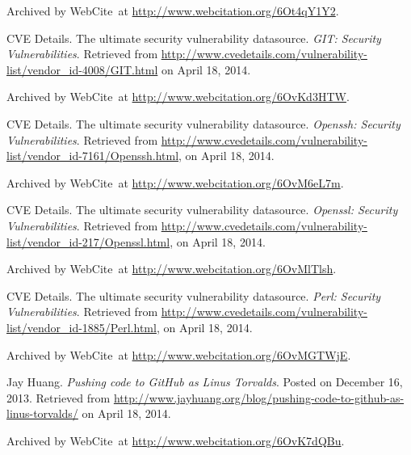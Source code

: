 \begin{thebibliography}{9}
Archived by WebCite\textsuperscript{\textregistered}\ at
\url{http://www.webcitation.org/6Ot4qY1Y2}.


CVE Details. The ultimate security vulnerability datasource. \emph{GIT:
Security Vulnerabilities}. Retrieved from
\url{http://www.cvedetails.com/vulnerability-list/vendor_id-4008/GIT.html} on
April 18, 2014.

Archived by WebCite\textsuperscript{\textregistered}\ at
\url{http://www.webcitation.org/6OvKd3HTW}.


CVE Details. The ultimate security vulnerability datasource. \emph{Openssh:
Security Vulnerabilities}. Retrieved from
\url{http://www.cvedetails.com/vulnerability-list/vendor_id-7161/Openssh.html},
on April 18, 2014.

Archived by WebCite\textsuperscript{\textregistered}\ at
\url{http://www.webcitation.org/6OvM6eL7m}.


CVE Details. The ultimate security vulnerability datasource. \emph{Openssl:
Security Vulnerabilities}. Retrieved from
\url{http://www.cvedetails.com/vulnerability-list/vendor_id-217/Openssl.html},
on April 18, 2014.

Archived by WebCite\textsuperscript{\textregistered}\ at
\url{http://www.webcitation.org/6OvMlTlsh}.


CVE Details. The ultimate security vulnerability datasource. \emph{Perl:
Security Vulnerabilities}. Retrieved from
\url{http://www.cvedetails.com/vulnerability-list/vendor_id-1885/Perl.html}, on
April 18, 2014.

Archived by WebCite\textsuperscript{\textregistered}\ at
\url{http://www.webcitation.org/6OvMGTWjE}.


Jay Huang. \emph{Pushing code to GitHub as Linus Torvalds}. Posted on December
16, 2013. Retrieved from
\url{http://www.jayhuang.org/blog/pushing-code-to-github-as-linus-torvalds/} on
April 18, 2014.

Archived by WebCite\textsuperscript{\textregistered}\ at
\url{http://www.webcitation.org/6OvK7dQBu}.



\end{thebibliography}
